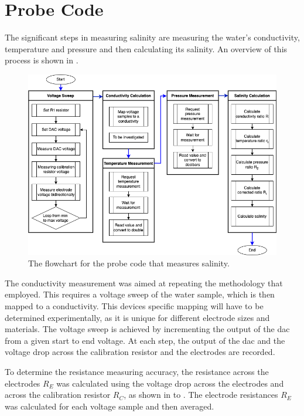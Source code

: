 \section{Probe Code}

The significant steps in measuring salinity are measuring the water's conductivity, temperature and pressure and then calculating its salinity.
An overview of this process is shown in .

\begin{figure}[ht]
    \centering
    \includegraphics[width=1\textwidth]{Figures/probe_flowchart}
    \caption{The flowchart for the probe code that measures salinity.}
    \label{fig:probe-code-flowchart} %
\end{figure}

The conductivity measurement was aimed at repeating the methodology that  employed.
This requires a voltage sweep of the water sample, which is then mapped to a conductivity.
This devices specific mapping will have to be determined experimentally, as it is unique for different electrode sizes and materials.
The voltage sweep is achieved by incrementing the output of the \gls{dac} from a given start to end voltage.
At each step, the output of the \gls{dac} and the voltage drop across the calibration resistor and the electrodes are recorded.

To determine the resistance measuring accuracy, the resistance across the electrodes $R_E$ was calculated using the voltage drop across the electrodes and across the calibration resistor $R_C$, as shown in  to .
The electrode resistances $R_E$ was calculated for each voltage sample and then averaged.


